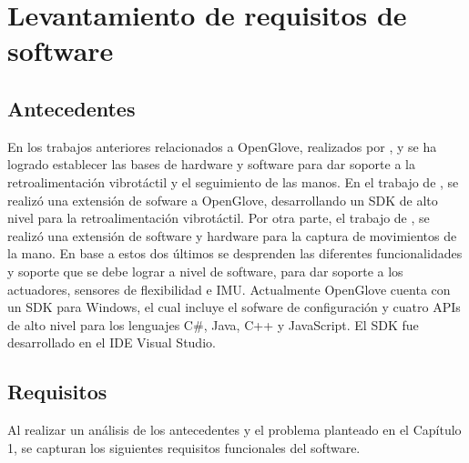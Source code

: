\section{Levantamiento de requisitos de software}

\subsection{Antecedentes}
En los trabajos anteriores relacionados a OpenGlove, realizados por \cite{tesis-monsalve-rodrigo}, \cite{tesis-meneses-sebastian} y \cite{tesis-cerda-rodrigo} se ha logrado establecer las bases de hardware y software para dar soporte a la retroalimentación vibrotáctil y el seguimiento de las manos. En el trabajo de \cite{tesis-meneses-sebastian}, se realizó una extensión de sofware a OpenGlove, desarrollando un SDK de alto nivel para la retroalimentación vibrotáctil. Por otra parte, el trabajo de \cite{tesis-cerda-rodrigo}, se realizó una extensión de software y hardware para la captura de movimientos de la mano. En base a estos dos últimos se desprenden las diferentes funcionalidades y soporte que se debe lograr a nivel de software, para dar soporte a los actuadores, sensores de flexibilidad e IMU. Actualmente OpenGlove cuenta con un SDK para Windows, el cual incluye el sofware de configuración y cuatro APIs de alto nivel para los lenguajes C\#, Java, C++ y JavaScript. El SDK fue desarrollado en el IDE Visual Studio.



\subsection{Requisitos}

Al realizar un análisis de los antecedentes y el problema planteado en el Capítulo 1, se capturan los siguientes requisitos funcionales del software.

